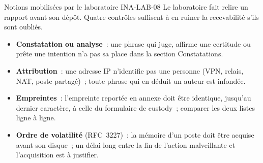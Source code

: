 \begin{boiteRemarque}{Notions mobilisées par le laboratoire INA-LAB-08}
Le laboratoire fait relire un rapport avant son dépôt. Quatre contrôles
suffisent à en ruiner la recevabilité s'ils sont oubliés.
\begin{itemize}
    \item \textbf{Constatation ou analyse}~: une phrase qui juge, affirme une
          certitude ou prête une intention n'a pas sa place dans la section
          Constatations.
    \item \textbf{Attribution}~: une adresse IP n'identifie pas une personne
          (VPN, relais, NAT, poste partagé)~; toute phrase qui en déduit un
          auteur est infondée.
    \item \textbf{Empreintes}~: l'empreinte reportée en annexe doit être
          identique, jusqu'au dernier caractère, à celle du formulaire de
          custody~; comparer les deux listes ligne à ligne.
    \item \textbf{Ordre de volatilité} (RFC~3227)~: la mémoire d'un poste
          doit être acquise avant son disque~; un délai long entre la fin de
          l'action malveillante et l'acquisition est à justifier.
\end{itemize}
\end{boiteRemarque}

